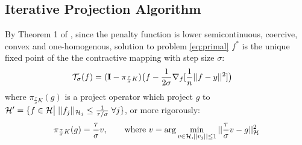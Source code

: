 \documentclass[tablecaption=bottom,wcp]{jmlr} %
\begin{document}
\subsection{Iterative Projection Algorithm}
By Theorem 1 of \citet{rosasco-prox-2009}, since the penalty function is lower semicontinuous, coercive, convex and one-homogenous,   solution to problem \ref{eq:primal} $f^*$ is the unique fixed point of the the contractive mapping with step size $\sigma$:
\begin{align*}
{\cal T}_\sigma(f) &= ({\bf I} - \pi_{\frac{\tau}{\sigma}K}) 
\big(f - \frac{1}{2\sigma} 
\nabla_f [ \frac{1}{n}||f - y||^2 ] \big)
\end{align*}
where $\pi_{\frac{\tau}{\sigma}K}(g)$ is a project operator which project $g$ to ${\cal H}' = \{f \in {\cal H} \big|\;   ||f_j||_{{\cal H}_j} \leq \frac{1}{\tau/\sigma} \; \forall j \}$, or more rigorously:
$$ \pi_{\frac{\tau}{\sigma}K}(g) = \frac{\tau}{\sigma} v, \qquad \mbox{where } v = \arg\min_{v\in {\cal H}, ||v_j||\leq 1} ||\frac{\tau}{\sigma}v - g||_{\cal H}^2$$
\end{document}
